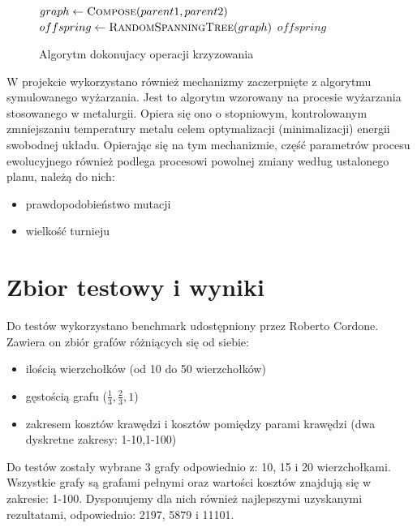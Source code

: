 \documentclass[12pt]{article}
\begin{document}
 
 
\begin{figure}[h!]
 \centering
\begin{algorithmic}
\State $graph \gets \Call{Compose}{parent1, parent2}$
\State $offspring \gets \Call{RandomSpanningTree}{graph}$
\Return $offspring$

\EndFunction

\end{algorithmic}
\caption{Algorytm dokonujacy operacji krzyzowania}
\end{figure}
 
 
W projekcie wykorzystano również mechanizmy zaczerpnięte z algorytmu symulowanego wyżarzania\Cite{SA}. Jest to algorytm wzorowany na procesie wyżarzania stosowanego w metalurgii. Opiera się ono o stopniowym, kontrolowanym zmniejszaniu temperatury metalu celem optymalizacji (minimalizacji) energii swobodnej układu. Opierając się na tym mechanizmie, część parametrów procesu ewolucyjnego również podlega procesowi powolnej zmiany według ustalonego planu, należą do nich:

\begin{itemize}
  \item prawdopodobieństwo mutacji
  \item wielkość turnieju
\end{itemize}


 \section{Zbior testowy i wyniki}


 Do testów wykorzystano benchmark udostępniony przez Roberto Cordone\cite{Bechmark}. Zawiera on zbiór grafów różniących się od siebie:
 
 \begin{itemize}
  \item ilością wierzchołków (od 10 do 50 wierzchołków)
  \item gęstością grafu ($\frac{1}{3}, \frac{2}{3}, 1$)
  \item zakresem kosztów krawędzi i kosztów pomiędzy parami krawędzi (dwa dyskretne zakresy: 1-10,1-100)
\end{itemize}

Do testów zostały wybrane 3 grafy odpowiednio z: 10, 15 i 20 wierzchołkami. Wszystkie grafy są grafami pełnymi oraz wartości kosztów znajdują się w zakresie: 1-100. Dysponujemy dla nich również najlepszymi uzyskanymi rezultatami, odpowiednio: 2197, 5879 i 11101\cite{Results}.
\end{document}
